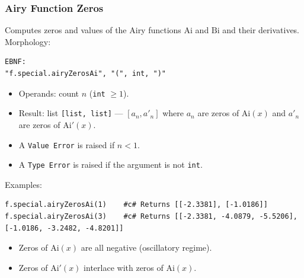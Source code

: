 \subsubsection{Airy Function Zeros}
Computes zeros and values of the Airy functions $\text{Ai}$ and $\text{Bi}$ and their derivatives. \\
Morphology:
\begin{verbatim}
EBNF:
"f.special.airyZerosAi", "(", int, ")"
\end{verbatim}
\begin{itemize}
\item Operands: count $n$ (\texttt{int} $\geq 1$).
\item Result: list \texttt{[list, list]} --- $[a_n, a'_n]$ where $a_n$ are zeros of $\text{Ai}(x)$ and $a'_n$ are zeros of $\text{Ai}'(x)$.
\item A \texttt{Value Error} is raised if $n < 1$.
\item A \texttt{Type Error} is raised if the argument is not \texttt{int}.
\end{itemize}
Examples:
\begin{verbatim}
f.special.airyZerosAi(1)    #c# Returns [[-2.3381], [-1.0186]]
f.special.airyZerosAi(3)    #c# Returns [[-2.3381, -4.0879, -5.5206], [-1.0186, -3.2482, -4.8201]]
\end{verbatim}
\begin{itemize}
\item Zeros of $\text{Ai}(x)$ are all negative (oscillatory regime).
\item Zeros of $\text{Ai}'(x)$ interlace with zeros of $\text{Ai}(x)$.
\end{itemize}

